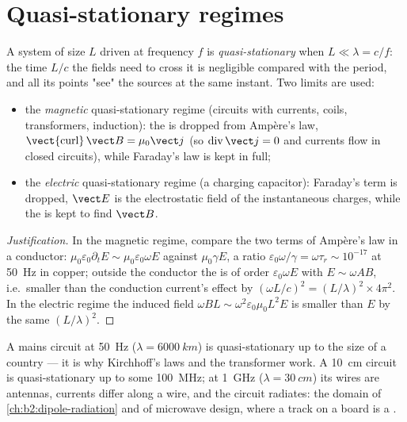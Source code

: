 \section{Quasi-stationary regimes}

\begin{definition}\label{def:b2:maxwell-equations:arqs}
A system of size $L$ driven at frequency $f$ is \emph{quasi-stationary}
when $L \ll \lambda = c/f$: the time $L/c$ the fields need to cross it is
negligible compared with the period, and all its points "see" the
sources at the same instant. Two limits are used:
\begin{itemize}
  \item the \emph{magnetic} quasi-stationary regime (circuits with
        currents, coils, transformers, induction): the  is dropped from Ampère's law, $\operatorname{\vect{curl}}\vect B
        = \mu_0\vect j$ (so $\operatorname{div}\vect j = 0$ and currents flow in
        closed circuits), while Faraday's law is kept in full;
  \item the \emph{electric} quasi-stationary regime (a charging
        capacitor): Faraday's term is dropped, $\vect E$ is the
        electrostatic field of the instantaneous charges, while the
         is kept to find $\vect B$.
\end{itemize}
\end{definition}

\begin{proof}[Justification]
In the magnetic regime, compare the two terms of Ampère's law in a
conductor: $\mu_0\varepsilon_0\partial_t E \sim \mu_0\varepsilon_0\omega E$ against $\mu_0\gamma E$,
a ratio $\varepsilon_0\omega/\gamma = \omega\tau_r \sim 10^{-17}$ at \qty{50}{Hz} in copper;
outside the conductor the  is of order
$\varepsilon_0\omega E$ with $E \sim \omega AB$, i.e.\ smaller than the conduction
current's effect by $(\omega L/c)^2 = (L/\lambda)^2 \times 4\pi^2$. In the electric
regime the induced field $\omega BL \sim \omega^2\varepsilon_0\mu_0L^2E$ is smaller than $E$
by the same $(L/\lambda)^2$.
\end{proof}

\begin{example}\label{ex:b2:maxwell-equations:sizes}
A mains circuit at \qty{50}{Hz} ($\lambda = \qty{6000}{km}$) is quasi-stationary
up to the size of a country --- it is why Kirchhoff's laws and the
transformer work. A \qty{10}{cm} circuit is quasi-stationary up to some
\qty{100}{MHz}; at \qty{1}{GHz} ($\lambda = \qty{30}{cm}$) its wires are antennas,
currents differ along a wire, and the circuit radiates: the domain of
\cref{ch:b2:dipole-radiation} and of microwave design, where a track on
a board is a .
\end{example}

